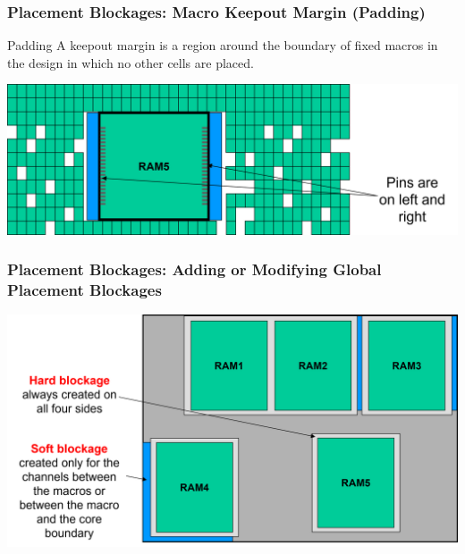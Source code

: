 \documentclass[compress]{beamer}
\begin{document}
\begin{frame}
	\frametitle{Placement Blockages: Macro Keepout Margin (Padding)}
	\begin{block}{Padding}
		A keepout margin is a region around the boundary of fixed macros in the design in which no other cells are placed.
	\end{block}
	\begin{center}
		\includegraphics[width=\textwidth]{keepout}
	\end{center}
\end{frame}
\begin{frame}
	\frametitle{Placement Blockages: Adding or Modifying Global Placement Blockages}
	\begin{center}
		\includegraphics[width=\textwidth]{Blockage}
	\end{center}
\end{frame}
\end{document}
